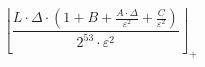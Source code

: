 \[\left\lfloor \frac{L \cdot \Delta \cdot \left(1 + B + \frac{A \cdot \Delta}{\varepsilon^{2}} + \frac{C}{\varepsilon^{2}}\right)}{2^{53} \cdot \varepsilon^{2}} \right\rfloor_{+}\]
